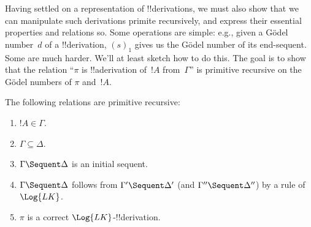 \documentclass[../../../include/open-logic-section]{subfiles}
\begin{document}
\begin{explain}
Having settled on a representation of !!{derivation}s, we must also
show that we can manipulate such derivations primite recursively, and
express their essential properties and relations so.  Some operations
are simple: e.g., given a G\"odel number~$d$ of a !!{derivation},
$(s)_1$ gives us the G\"odel number of its end-sequent.  Some are
much harder.  We'll at least sketch how to do this.  The goal is to
show that the relation ``$\pi$ is !!a{derivation} of~$!A$
from~$\Gamma$'' is primitive recursive on the G\"odel numbers of
$\pi$ and~$!A$.
\end{explain}

\begin{prop}
The following relations are primitive recursive:
\begin{enumerate}
\item $!A \in \Gamma$.
\item $\Gamma \subseteq \Delta$.
\item $\Gamma \Sequent \Delta$ is an initial sequent.
\item $\Gamma \Sequent \Delta$ follows from $\Gamma' \Sequent \Delta'$
  (and $\Gamma'' \Sequent \Delta''$) by a rule of $\Log{LK}$.
\item $\pi$ is a correct $\Log{LK}$-!!{derivation}.
\end{enumerate}
\end{prop}
\end{document}
